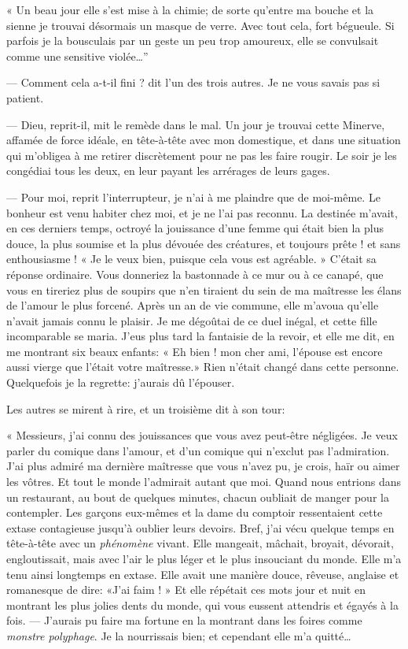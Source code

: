 « Un beau jour elle s’est mise à la chimie; de sorte
qu’entre ma bouche et la sienne je trouvai désormais
un masque de verre. Avec tout cela, fort bégueule. Si parfois je la
bousculais par un geste un peu trop amoureux, elle se convulsait comme
une sensitive violée\ldots''

--- Comment cela a{}-t{}-il fini ? dit l’un des trois
autres. Je ne vous savais pas si patient.

--- Dieu, reprit{}-il, mit le remède dans le mal. Un jour je trouvai cette
Minerve, affamée de force idéale, en tête{}-à{}-tête avec mon
domestique, et dans une situation qui m’obligea à me
retirer discrètement pour ne pas les faire rougir. Le soir je les
congédiai tous les deux, en leur payant les arrérages de leurs gages.

--- Pour moi, reprit l’interrupteur, je
n’ai à me plaindre que de moi{}-même. Le bonheur est
venu habiter chez moi, et je ne l’ai pas reconnu. La
destinée m’avait, en ces derniers temps, octroyé la
jouissance d’une femme qui était bien la plus douce,
la plus soumise et la plus dévouée des créatures, et toujours prête !
et sans enthousiasme ! « Je le veux bien, puisque cela vous est
agréable. » C’était sa réponse ordinaire. Vous
donneriez la bastonnade à ce mur ou à ce canapé, que vous en tireriez
plus de soupirs que n’en tiraient du sein de ma
maîtresse les élans de l’amour le plus forcené. Après
un an de vie commune, elle m’avoua
qu’elle n’avait jamais connu le
plaisir. Je me dégoûtai de ce duel inégal, et cette fille incomparable
se maria. J’eus plus tard la fantaisie de la revoir,
et elle me dit, en me montrant six beaux enfants: « Eh bien ! mon cher
ami, l’épouse est encore aussi vierge que
l’était votre maîtresse.» Rien
n’était changé dans cette personne. Quelquefois je la
regrette: j’aurais dû l’épouser.

Les autres se mirent à rire, et un troisième dit à son tour:

« Messieurs, j’ai connu des jouissances que vous avez
peut{}-être négligées. Je veux parler du comique dans
l’amour, et d’un comique qui
n’exclut pas l’admiration.
J’ai plus admiré ma dernière maîtresse que vous
n’avez pu, je crois, haïr ou aimer les vôtres. Et tout
le monde l’admirait autant que moi. Quand nous
entrions dans un restaurant, au bout de quelques minutes, chacun
oubliait de manger pour la contempler. Les garçons eux{}-mêmes et la
dame du comptoir ressentaient cette extase contagieuse
jusqu’à oublier leurs devoirs. Bref,
j’ai vécu quelque temps en tête{}-à{}-tête avec un
\textit{phénomène} vivant. Elle mangeait, mâchait, broyait, dévorait,
engloutissait, mais avec l’air le plus léger et le
plus insouciant du monde. Elle m’a tenu ainsi
longtemps en extase. Elle avait une manière douce, rêveuse, anglaise et
romanesque de dire: «J’ai faim ! » Et elle répétait
ces mots jour et nuit en montrant les plus jolies dents du monde, qui
vous eussent attendris et égayés à la fois. --- J’aurais
pu faire ma fortune en la montrant dans les foires comme \textit{monstre
polyphage}. Je la nourrissais bien; et cependant elle
m’a quitté\ldots\ 

